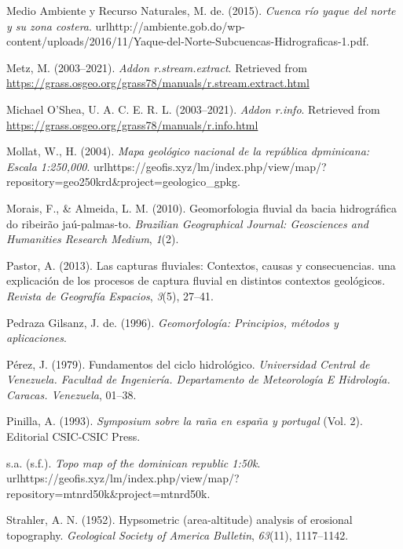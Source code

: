 \documentclass[11pt,]{article}
\begin{document}
\hypertarget{ref-Mmar2015cuenca}{}
Medio Ambiente y Recurso Naturales, M. de. (2015). \emph{Cuenca río
yaque del norte y su zona costera}.
urlhttp://ambiente.gob.do/wp-content/uploads/2016/11/Yaque-del-Norte-Subcuencas-Hidrograficas-1.pdf.

\hypertarget{ref-streamnextractmarkus}{}
Metz, M. (2003--2021). \emph{Addon r.stream.extract}. Retrieved from
\url{https://grass.osgeo.org/grass78/manuals/r.stream.extract.html}

\hypertarget{ref-rinfo}{}
Michael O'Shea, U. A. C. E. R. L. (2003--2021). \emph{Addon r.info}.
Retrieved from \url{https://grass.osgeo.org/grass78/manuals/r.info.html}

\hypertarget{ref-Mollat2004mapa}{}
Mollat, W., H. (2004). \emph{Mapa geológico nacional de la república
dpminicana: Escala 1:250,000}.
urlhttps://geofis.xyz/lm/index.php/view/map/?repository=geo250krd\&project=geologico\_gpkg.

\hypertarget{ref-morais2010geomorfologia}{}
Morais, F., \& Almeida, L. M. (2010). Geomorfologia fluvial da bacia
hidrográfica do ribeirão jaú-palmas-to. \emph{Brazilian Geographical
Journal: Geosciences and Humanities Research Medium}, \emph{1}(2).

\hypertarget{ref-pastor2013capturas}{}
Pastor, A. (2013). Las capturas fluviales: Contextos, causas y
consecuencias. una explicación de los procesos de captura fluvial en
distintos contextos geológicos. \emph{Revista de Geografía Espacios},
\emph{3}(5), 27--41.

\hypertarget{ref-pedraza1996geomorfologia}{}
Pedraza Gilsanz, J. de. (1996). \emph{Geomorfología: Principios, métodos
y aplicaciones}.

\hypertarget{ref-perez1979fundamentos}{}
Pérez, J. (1979). Fundamentos del ciclo hidrológico. \emph{Universidad
Central de Venezuela. Facultad de Ingeniería. Departamento de
Meteorología E Hidrología. Caracas. Venezuela}, 01--38.

\hypertarget{ref-pinilla1993symposium}{}
Pinilla, A. (1993). \emph{Symposium sobre la raña en españa y portugal}
(Vol. 2). Editorial CSIC-CSIC Press.

\hypertarget{ref-TopoMap}{}
s.a. (s.f.). \emph{Topo map of the dominican republic 1:50k}.
urlhttps://geofis.xyz/lm/index.php/view/map/?repository=mtnrd50k\&project=mtnrd50k.

\hypertarget{ref-strahler1952hypsometric}{}
Strahler, A. N. (1952). Hypsometric (area-altitude) analysis of
erosional topography. \emph{Geological Society of America Bulletin},
\emph{63}(11), 1117--1142.
\end{document}
